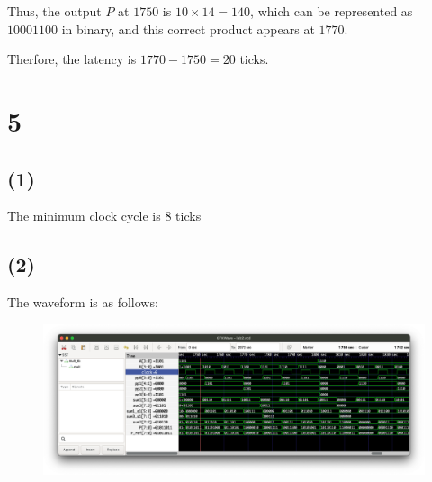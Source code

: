 \documentclass{article}
\begin{document}
Thus, the output $P$ at $1750$ is $10 \times 14 = 140$, which can be represented as $10001100$ in binary, 
and this correct product appears at $1770$.
\bigskip

Therfore, the latency is $1770 - 1750 = 20$ ticks.

\section*{5}

\subsection*{(1)}

The minimum clock cycle is $8$ ticks

\subsection*{(2)}

The waveform is as follows:

\begin{figure}[H]
    \centering
    \includegraphics[width=\textwidth]{5_2.png}
\end{figure}
\end{document}
